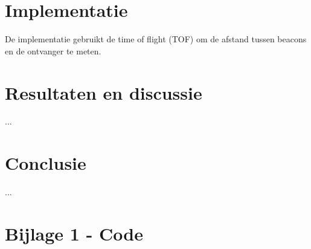 \documentclass[a4paper,10pt]{article}
\begin{document}
\section{Implementatie}
De implementatie gebruikt de time of flight (TOF) om de afstand tussen beacons en de ontvanger te meten.




\section{Resultaten en discussie}\label{sec:resultaten}
...

\section{Conclusie}\label{sec:conclusie}
...

\newpage
\appendix
\section{Bijlage 1 - Code}
\label{sec:code}




\end{document}

